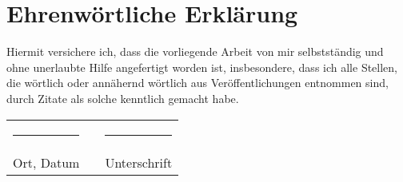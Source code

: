 \section*{Ehrenwörtliche Erklärung}
Hiermit versichere ich, dass die vorliegende Arbeit von mir selbstständig
und ohne unerlaubte Hilfe angefertigt worden ist, insbesondere, dass ich
alle Stellen, die wörtlich oder annähernd wörtlich aus Veröffentlichungen
entnommen sind, durch Zitate als solche kenntlich gemacht habe.

\begin{tabular}{lcl}
    \rule{4cm}{1pt} & \hspace{4cm} & \rule{4cm}{1pt} \\
    Ort, Datum & & Unterschrift
\end{tabular}